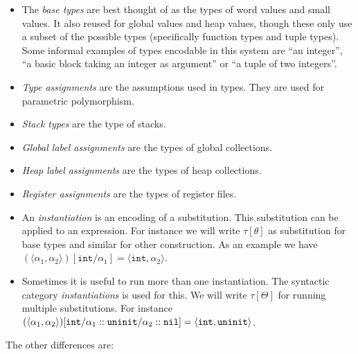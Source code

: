 \begin{itemize}
\item The \emph{base types} are best thought of as the types of word values and
  small values. It also reused for global values and heap values, though these
  only use a subset of the possible types (specifically function types and tuple
  types). Some informal examples of types encodable in this system are ``an
  integer'', ``a basic block taking an integer as argument'' or ``a tuple of two
  integers''. 
\item \emph{Type assignments} are the assumptions used in types. They are used
  for parametric polymorphism.
\item \emph{Stack types} are the type of stacks.
\item \emph{Global label assignments} are the types of global collections.
\item \emph{Heap label assignments} are the types of heap collections.
\item \emph{Register assignments} are the types of register files.
\item An \emph{instantiation} is an encoding of a substitution. This substitution can
  be applied to an expression. For instance we will write $\tau[\theta]$ as
  substitution for base types and similar for other construction. As an example
  we have
  $(\langle \alpha_1, \alpha_2 \rangle)[\mathtt{int} / \alpha_1] = \langle
  \mathtt{int}, \alpha_2 \rangle$.
\item Sometimes it is useful to run more than one instantiation. The syntactic
  category \emph{instantiations} is used for this. We will write $\tau[\Theta]$
  for running multiple substitutions.  For instance
  $(\langle \alpha_1, \alpha_2 \rangle)[\mathtt{int} / \alpha_1 :: \mathtt{uninit} /
  \alpha_2 :: \mathtt{nil}] = \langle \mathtt{int}, \mathtt{uninit} \rangle$.
\end{itemize}

The other differences are:

